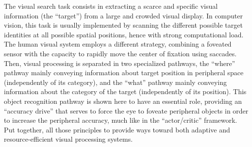 The visual search task consists in extracting a scarce and specific visual information (the ``target'') from a large and crowded visual display. In computer vision, this task is usually implemented by scanning the different possible target identities at all possible spatial positions, hence with strong computational load. The human visual system employs a different strategy, combining a foveated sensor with the capacity to rapidly move the center of fixation using saccades. Then, visual processing is separated in two specialized pathways, the ``where'' pathway mainly conveying information about target position in peripheral space (independently of its category), and the ``what'' pathway mainly conveying information about the category of the target (independently of its position). This object recognition pathway is shown here to have an essential role, providing an ``accuracy drive'' that serves to force the eye to foveate peripheral objects in order to increase the peripheral accuracy, much like in the ``actor/critic'' framework. Put together, all those principles to provide ways toward both adaptive and resource-efficient visual processing systems.